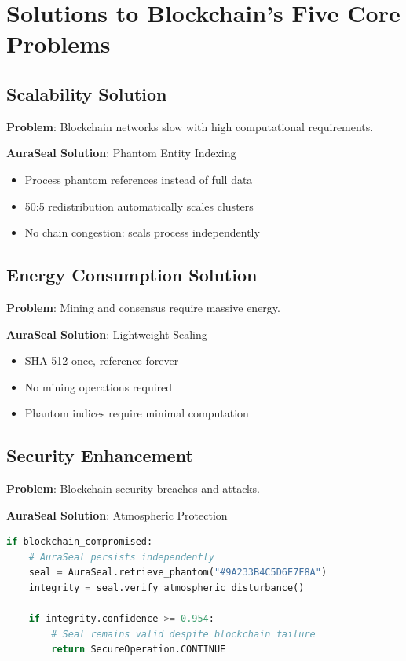 \documentclass[12pt,a4paper]{report}
\theoremstyle{definition}
\begin{document}
\chapter{Solutions to Blockchain's Five Core Problems}

\section{Scalability Solution}

\textbf{Problem}: Blockchain networks slow with high computational requirements.

\textbf{AuraSeal Solution}: Phantom Entity Indexing
\begin{itemize}
    \item Process phantom references instead of full data
    \item 50:5 redistribution automatically scales clusters
    \item No chain congestion: seals process independently
\end{itemize}

\section{Energy Consumption Solution}

\textbf{Problem}: Mining and consensus require massive energy.

\textbf{AuraSeal Solution}: Lightweight Sealing
\begin{itemize}
    \item SHA-512 once, reference forever
    \item No mining operations required
    \item Phantom indices require minimal computation
\end{itemize}

\section{Security Enhancement}

\textbf{Problem}: Blockchain security breaches and attacks.

\textbf{AuraSeal Solution}: Atmospheric Protection
\begin{lstlisting}[language=Python, caption=Security Through Atmospheric Sealing]
if blockchain_compromised:
    # AuraSeal persists independently
    seal = AuraSeal.retrieve_phantom("#9A233B4C5D6E7F8A")
    integrity = seal.verify_atmospheric_disturbance()
    
    if integrity.confidence >= 0.954:
        # Seal remains valid despite blockchain failure
        return SecureOperation.CONTINUE
\end{lstlisting}
\end{document}
